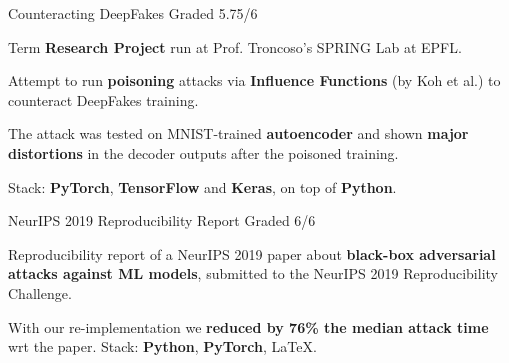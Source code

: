 

\begin{cventries}
  \cventry
  {Counteracting DeepFakes} %
  {} %
  {} %
  {Graded 5.75/6} %
  {
    \begin{cvitems} %
      \item Term \textbf{Research Project} run at Prof. Troncoso's SPRING Lab at EPFL.
      \item Attempt to run \textbf{poisoning} attacks via \textbf{Influence Functions} (by Koh et al.) to counteract DeepFakes training.
      \item The attack was tested on MNIST-trained \textbf{autoencoder} and shown \textbf{major distortions} in the decoder outputs after the poisoned training.
      \item Stack: \textbf{PyTorch}, \textbf{TensorFlow} and \textbf{Keras}, on top of \textbf{Python}.
    \end{cvitems}
  }



  \cventry
  {NeurIPS 2019 Reproducibility Report} %
  {} %
  {} %
  {Graded 6/6} %
  {
    \begin{cvitems} %
      \item Reproducibility report of a NeurIPS 2019 paper about \textbf{black-box adversarial attacks against ML models}, submitted to the NeurIPS 2019 Reproducibility Challenge.
      \item With our re-implementation we \textbf{reduced by 76\% the median attack time} wrt the paper. Stack: \textbf{Python}, \textbf{PyTorch}, \LaTeX.
    \end{cvitems}
  }

\end{cventries}
